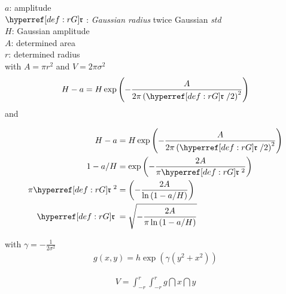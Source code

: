 
$a$: amplitude\\
$\rG$: \textit{Gaussian radius} \ie twice Gaussian \textit{std} \\
$H$: Gaussian amplitude\\
$A$: determined area\\
$r$: determined radius\\
with $A=\pi r^2$ and $V=2\pi\sigma^2$
\begin{align}
 H-a 
&= 
H \exp \left( -\frac{A}{2 \pi \left( \rG/2 \right)^2}  \right) \\ 
\end{align}
and

\begin{align}
 H-a 
&= 
H \exp \left( -\frac{A}{2 \pi \left( \rG/2 \right)^2}  \right) \\
  1-a/H 
&= 
 \exp \left( -\frac{2A}{\pi \rG^2}  \right) \\
  \pi \rG^2
&= 
  \left( -\frac{2A}{\ln \l 1-a/H \r }  \right) \\
 \rG
&= 
 \sqrt{-\frac{2A}{\pi \ln \l 1-a/H \r }}  \\
\end{align}
















with $\gamma=-\frac{1}{2 \sigma^2} $ \\
\begin{align}
g(x,y)= h \exp \left(\gamma \left(  y^2 + x^2 \right) \right)
\end{align}

\begin{align}
V =  \int_{-r}^{r}\int_{-r}^{r} g \dint{x}\dint{y}
\end{align}

